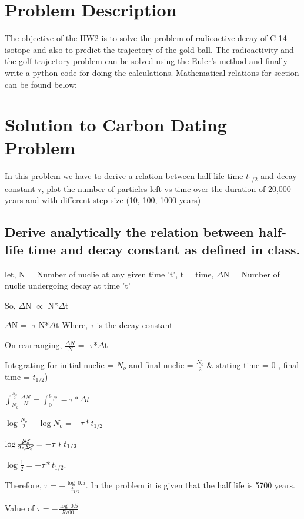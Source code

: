 \documentclass[11pt]{article}
\begin{document}
\section{Problem Description}
The objective of the HW2 is to solve the problem of radioactive decay of C-14 isotope and also to predict the trajectory of the gold ball. The radioactivity and the golf trajectory problem can be solved using the Euler's method and finally write a python code for doing the calculations.  Mathematical relations for section can be found below:

\section{Solution to Carbon Dating Problem}

In this problem we have to derive a relation between half-life time $t_{1/2}$ and decay constant $\tau$,  plot the number of particles left vs time over the duration of 20,000 years and with different step size (10, 100, 1000 years)

\subsection{Derive analytically the relation between half-life time  and decay constant as defined in class.}
let, N = Number of nuclie at any given time 't', t = time, $\Delta$N = Number of nuclie undergoing decay at time 't'

So, $\Delta$N $\propto $ N*$\Delta$t

$\Delta$N = -$\tau$ N*$\Delta$t {Where, $\tau$ is the decay constant}

On rearranging,
$\frac{\Delta N}{N}$ = -$\tau$*$\Delta$t

Integrating for initial nuclie = $N_{o}$ and final nuclie = $\frac{N_{o}}{2}$ \& stating time  = 0 , final time = $t_{1/2}$)

$\int_{N_{o}}^{\frac{N_{o}}{2}}\frac{\Delta N}{N} = \int_{0}^{t_{1/2}}-\tau*\Delta t$

$\log\frac{N_{o}}{2} - \log N_{o} = -\tau*t_{1/2}$

$\log\frac{\cancel{N_{o}}}{2*\cancel{N_{o}}} = -\tau*t_{1/2}$

$\log\frac{1}{2} = -\tau*t_{1/2}$. 

Therefore, $\tau = -\frac{\log\ 0.5}{t_{1/2}}$.
In the problem it is given that the half life is 5700 years.

Value of $\tau = -\frac{\log\ 0.5}{5700}$
\end{document}
